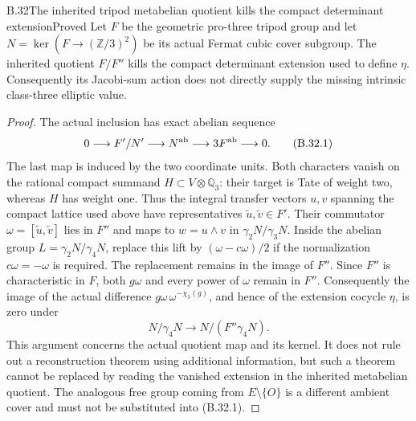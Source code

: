 \begin{statement}{B.32}{The inherited tripod metabelian quotient kills the compact determinant extension}{Proved}
Let $F$ be the geometric pro-three tripod group and let
$N=\ker(F\to(\mathbb Z/3)^2)$ be its actual Fermat cubic
cover subgroup. The inherited quotient $F/F''$ kills
the compact determinant extension used to define $\eta$.
Consequently its Jacobi-sum action does not directly
supply the missing intrinsic class-three elliptic value.
\end{statement}
\begin{proof}
The actual inclusion has exact abelian sequence
\[
 0\longrightarrow F'/N'\longrightarrow N^{\rm ab}
           \longrightarrow3F^{\rm ab}\longrightarrow0.
                                                               \tag{B.32.1}
\]
The last map is induced by the two coordinate units.
Both characters vanish on the rational compact summand
$H\subset V\otimes\mathbb Q_3$: their target is Tate
of weight two, whereas $H$ has weight one.
Thus the integral transfer vectors $u,v$ spanning the
compact lattice used above have representatives
$\widetilde u,\widetilde v\in F'$.
Their commutator $\omega=[\widetilde u,\widetilde v]$
lies in $F''$ and maps to $w=u\wedge v$ in
$\gamma_2N/\gamma_3N$.
Inside the abelian group $L=\gamma_2N/\gamma_4N$,
replace this lift by $(\omega-c\omega)/2$ if the
normalization $c\omega=-\omega$ is required.
The replacement remains in the image of $F''$.
Since $F''$ is characteristic in $F$, both $g\omega$
and every power of $\omega$ remain in $F''$.
Consequently the image of the actual difference
$g\omega\,\omega^{-\chi_3(g)}$, and hence of the
extension cocycle $\eta$, is zero under
\[
 N/\gamma_4N\longrightarrow N/(F''\gamma_4N).
                                                               \tag{B.32.2}
\]
This argument concerns the actual quotient map and its
kernel. It does not rule out a reconstruction theorem
using additional information, but such a theorem cannot
be replaced by reading the vanished extension in the
inherited metabelian quotient. The analogous free group
coming from $E\setminus\{O\}$ is a different ambient
cover and must not be substituted into (B.32.1).
\end{proof}
